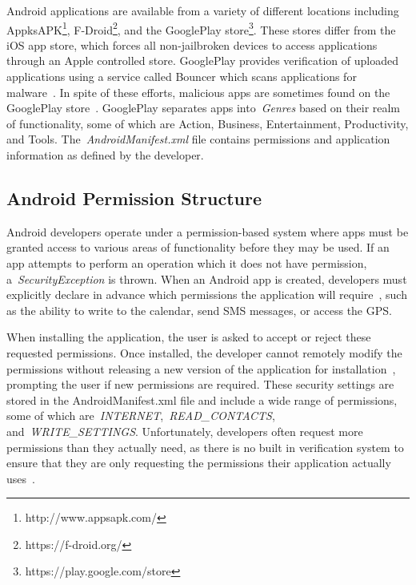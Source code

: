 Android applications are available from a variety of different locations including AppksAPK\footnote{http://www.appsapk.com/}, F-Droid\footnote{https://f-droid.org/}, and the GooglePlay store\footnote{https://play.google.com/store}. These stores differ from the iOS app store, which forces all non-jailbroken devices to access applications through an Apple controlled store. GooglePlay provides verification of uploaded applications using a service called Bouncer which scans applications for malware~\cite{bouncer_url1}. In spite of these efforts, malicious apps are sometimes found on the GooglePlay store~\cite{Zhou:2012:DAM:2310656.2310710}. GooglePlay separates apps into~\emph{Genres} based on their realm of functionality, some of which are Action, Business, Entertainment, Productivity, and Tools. The~\emph{AndroidManifest.xml} file contains permissions and application information as defined by the developer.

\subsection{Android Permission Structure}
Android developers operate under a permission-based system where apps must be granted access to various areas of functionality before they may be used. If an app attempts to perform an operation which it does not have permission, a~\emph{SecurityException} is thrown. When an Android app is created, developers must explicitly declare in advance which permissions the application will require~\cite{Felt:2011:APD:2046707.2046779}, such as the ability to write to the calendar, send SMS messages, or access the GPS.

When installing the application, the user is asked to accept or reject these requested permissions. Once installed, the developer cannot remotely modify the permissions without releasing a new version of the application for installation~\cite{shaerpour2013trends}, prompting the user if new permissions are required. These security settings are stored in the AndroidManifest.xml file and include a wide range of permissions, some of which are~\emph{INTERNET},~\emph{READ\_CONTACTS}, and~\emph{WRITE\_SETTINGS}. Unfortunately, developers often request more permissions than they actually need, as there is no built in verification system to ensure that they are only requesting the permissions their application actually uses~\cite{Felt:2011:APD:2046707.2046779}.

